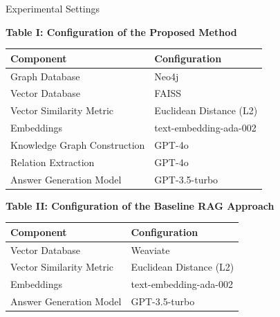 \documentclass[aspectratio=169,xcolor=dvipsnames]{beamer}
\begin{document}
	\begin{frame}{Experimental Settings}
		
		\scriptsize
		\centering
		
		{\textbf{\textcolor{blue!70}{Table I: Configuration of the Proposed Method}}}
		
		\vspace{0.15cm}
		
		\begin{tabular}{|l|l|}
			\hline
			\textbf{\textcolor{purple!80}{Component}} & \textbf{\textcolor{purple!80}{Configuration}} \\
			\hline
			Graph Database & Neo4j \\
			Vector Database & FAISS \\
			Vector Similarity Metric & Euclidean Distance (L2) \\
			Embeddings & text-embedding-ada-002 \\
			Knowledge Graph Construction & GPT-4o \\
			Relation Extraction & GPT-4o \\
			Answer Generation Model & GPT-3.5-turbo \\
			\hline
		\end{tabular}
		
		\vspace{0.5cm}
		
		{\textbf{\textcolor{blue!70}{Table II: Configuration of the Baseline RAG Approach}}}
		
		\vspace{0.15cm}
		
		\begin{tabular}{|l|l|}
			\hline
			\textbf{\textcolor{purple!80}{Component}} & \textbf{\textcolor{purple!80}{Configuration}} \\
			\hline
			Vector Database & Weaviate \\
			Vector Similarity Metric & Euclidean Distance (L2) \\
			Embeddings & text-embedding-ada-002 \\
			Answer Generation Model & GPT-3.5-turbo \\
			\hline
		\end{tabular}
		
	\end{frame}
	
\end{document}
